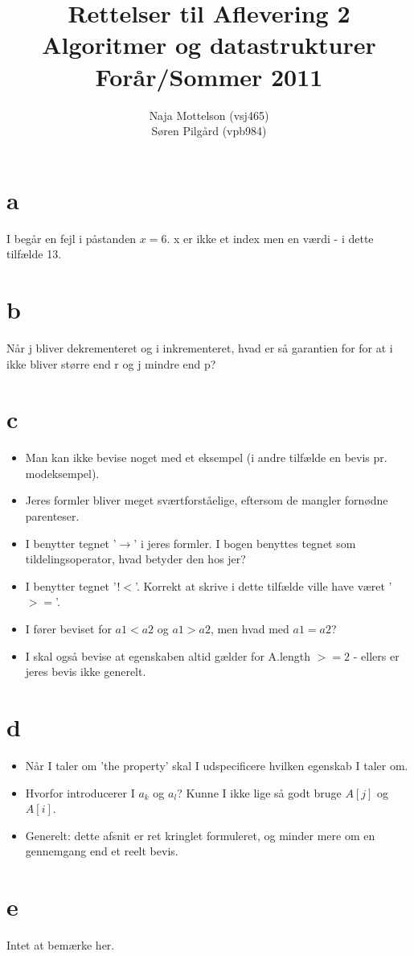 \documentclass[10pt,a4paper,danish]{article}
\title{Rettelser til Aflevering 2 \\Algoritmer og datastrukturer\\Forår/Sommer 2011}
\author{Naja Mottelson (vsj465)\\Søren Pilgård (vpb984)}
\begin{document}
\maketitle
\newpage

\section{a}
I begår en fejl i påstanden $x = 6$. x er ikke et index men en værdi - i dette tilfælde 13. 

\section{b}
Når j bliver dekrementeret og i inkrementeret, hvad er så garantien for for at i ikke 
bliver større end r og j mindre end p? 

\section{c}
\begin{itemize}
\item Man kan ikke bevise noget med et eksempel (i andre tilfælde en bevis pr. modeksempel). 
\item Jeres formler bliver meget sværtforståelige, eftersom de mangler fornødne parenteser. 
\item I benytter tegnet '$\rightarrow$' i jeres formler. I bogen benyttes tegnet som tildelingsoperator, 
hvad betyder den hos jer?
\item I benytter tegnet '!$<$'. Korrekt at skrive i dette tilfælde ville have været '$>=$'. 
\item I fører beviset for $a1 < a2$ og $a1 > a2$, men hvad med $a1 = a2$?
\item I skal også bevise at egenskaben altid gælder for A.length $>= 2$ - ellers er jeres bevis
ikke generelt.  
\end{itemize}


\section{d}
\begin{itemize}
\item Når I taler om 'the property' skal I udspecificere hvilken egenskab I taler om. 
\item Hvorfor introducerer I $a_k$ og $a_l$? Kunne I ikke lige så godt bruge $A[j]$ og $A[i]$. 
\item Generelt: dette afsnit er ret kringlet formuleret, og minder mere om en gennemgang end
et reelt bevis. 
\end{itemize}

\section{e}
Intet at bemærke her. 
\end{document}
